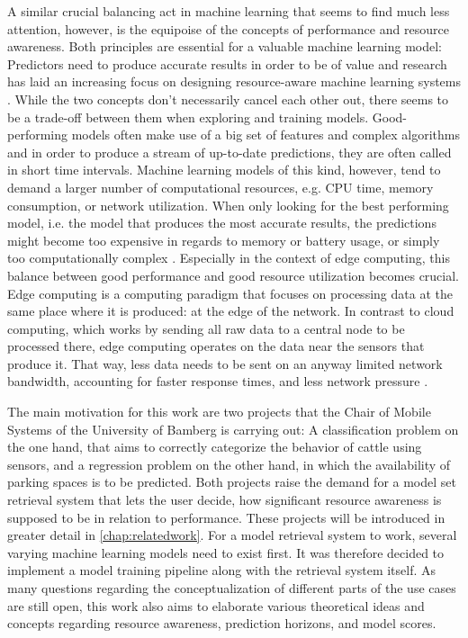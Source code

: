 A similar crucial balancing act in machine learning that seems to find much less attention, however, is the equipoise of the concepts of performance and resource awareness. Both principles are essential for a valuable machine learning model: Predictors need to produce accurate results in order to be of value and research has laid an increasing focus on designing resource-aware machine learning systems \cite{rapp2022}. While the two concepts don’t necessarily cancel each other out, there seems to be a trade-off between them when exploring and training models. Good-performing models often make use of a big set of features and complex algorithms and in order to produce a stream of up-to-date predictions, they are often called in short time intervals. Machine learning models of this kind, however, tend to demand a larger number of computational resources, e.g. CPU time, memory consumption, or network utilization. When only looking for the best performing model, i.e. the model that produces the most accurate results, the predictions might become too expensive in regards to memory or battery usage, or simply too computationally complex \cite{preuveneers2020}. Especially in the context of edge computing, this balance between good performance and good resource utilization becomes crucial. Edge computing is a computing paradigm that focuses on processing data at the same place where it is produced: at the edge of the network. In contrast to cloud computing, which works by sending all raw data to a central node to be processed there, edge computing operates on the data near the sensors that produce it. That way, less data needs to be sent on an anyway limited network bandwidth, accounting for faster response times, and less network pressure \cite{shi2016}.

The main motivation for this work are two projects that the Chair of Mobile Systems of the University of Bamberg is carrying out: A classification problem on the one hand, that aims to correctly categorize the behavior of cattle using sensors, and a regression problem on the other hand, in which the availability of parking spaces is to be predicted. Both projects raise the demand for a model set retrieval system that lets the user decide, how significant resource awareness is supposed to be in relation to performance. These projects will be introduced in greater detail in \autoref{chap:relatedwork}. For a model retrieval system to work, several varying machine learning models need to exist first. It was therefore decided to implement a model training pipeline along with the retrieval system itself. As many questions regarding the conceptualization of different parts of the use cases are still open, this work also aims to elaborate various theoretical ideas and concepts regarding resource awareness, prediction horizons, and model scores.

